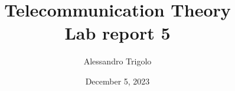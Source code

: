 \title{\vspace{160px} \textbf{\huge{Telecommunication Theory}} \\\vspace{17.5px} \LARGE{Lab report 5}  \vspace{10px}}
\author{Alessandro Trigolo}
\date{December 5, 2023}


\maketitle \newpage








